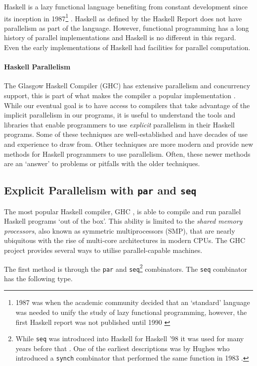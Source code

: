 Haskell is a lazy functional language benefiting from constant development
since its inception in 1987\footnote{1987 was when the academic community
decided that an `standard' language was needed to unify the study of lazy
functional programming\citep{HistoryOfHaskell}, however, the first Haskell
report was not published until 1990 \citep{Haskell98Book}}
\citep{HistoryOfHaskell, Haskell98Book}. Haskell as defined by the Haskell
Report \citep{haskellReport} does not have parallelism as part of the language.
However, functional programming has a long history of parallel implementations
and Haskell is no different in this regard. Even the early implementations of
Haskell had facilities for parallel computation.

\paragraph{Haskell Parallelism}

The Glasgow Haskell Compiler (GHC) has extensive parallelism and concurrency
support, this is part of what makes the compiler a popular implementation
\citep{HistoryOfHaskell}. While our eventual goal is to have access to
compilers that take advantage of the implicit parallelism in our programs, it
is useful to understand the tools and libraries that enable programmers to use
\emph{explicit} parallelism in their Haskell programs. Some of these techniques
are well-established and have decades of use and experience to draw from. Other
techniques are more modern and provide new methods for Haskell programmers to
use parallelism. Often, these newer methods are an `answer' to problems or
pitfalls with the older techniques.

\subsection{Explicit Parallelism with \texttt{par} and \texttt{seq}}

The most popular Haskell compiler, GHC \citep{HistoryOfHaskell}, is able to
compile and run parallel Haskell programs `out of the box'. This ability is
limited to the \emph{shared memory processors}, also known as symmetric
multiprocessors (SMP), that are nearly ubiquitous with the rise of multi-core
architectures in modern CPUs. The GHC project provides several ways to utilise
parallel-capable machines.

The first method is through the \verb=par= and \verb=seq=\footnote{While
\texttt{seq} was introduced into Haskell for Haskell '98 \citep{Haskell98Book}
it was used for many years before that \citep{HistoryOfHaskell}. One of the
earliest descriptions was by Hughes who introduced a \texttt{synch} combinator
that performed the same function in 1983 \citep{hughes:thesis}.} combinators.
The \verb=seq= combinator has the following type.

